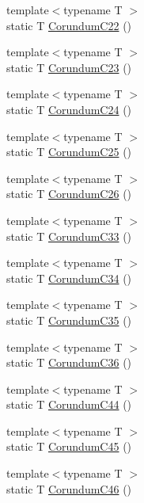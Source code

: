 \begin{DoxyCompactItemize}
{\footnotesize template$<$typename T $>$ }\\static T \mbox{\hyperlink{namespacempc_1_1data_a66e512e49dfa1aa7f95c2073491352bf}{Corundum\+C22}} ()
\item 
{\footnotesize template$<$typename T $>$ }\\static T \mbox{\hyperlink{namespacempc_1_1data_a04ee3c933c108c08e9d6dfd36d41538d}{Corundum\+C23}} ()
\item 
{\footnotesize template$<$typename T $>$ }\\static T \mbox{\hyperlink{namespacempc_1_1data_a6a0486ab291bd5177742e50782fa437d}{Corundum\+C24}} ()
\item 
{\footnotesize template$<$typename T $>$ }\\static T \mbox{\hyperlink{namespacempc_1_1data_a796a0549516d3ca6097b2df0fd089e51}{Corundum\+C25}} ()
\item 
{\footnotesize template$<$typename T $>$ }\\static T \mbox{\hyperlink{namespacempc_1_1data_a0c66b9336c273fac1f61de8066296585}{Corundum\+C26}} ()
\item 
{\footnotesize template$<$typename T $>$ }\\static T \mbox{\hyperlink{namespacempc_1_1data_a0998118d5bfefe62f2562754a455bc6f}{Corundum\+C33}} ()
\item 
{\footnotesize template$<$typename T $>$ }\\static T \mbox{\hyperlink{namespacempc_1_1data_a0c5d889d0235384d47297eed4aefdea1}{Corundum\+C34}} ()
\item 
{\footnotesize template$<$typename T $>$ }\\static T \mbox{\hyperlink{namespacempc_1_1data_a65507f6191b27515bbcb02f456254042}{Corundum\+C35}} ()
\item 
{\footnotesize template$<$typename T $>$ }\\static T \mbox{\hyperlink{namespacempc_1_1data_aa692b36507972d312ded3a06dfd51d58}{Corundum\+C36}} ()
\item 
{\footnotesize template$<$typename T $>$ }\\static T \mbox{\hyperlink{namespacempc_1_1data_aabdcb48654339bafdde09939d6ace19d}{Corundum\+C44}} ()
\item 
{\footnotesize template$<$typename T $>$ }\\static T \mbox{\hyperlink{namespacempc_1_1data_af222e2065c81110150101038ea5e64fa}{Corundum\+C45}} ()
\item 
{\footnotesize template$<$typename T $>$ }\\static T \mbox{\hyperlink{namespacempc_1_1data_ab260906575e5653e282a97bcf4b93c3f}{Corundum\+C46}} ()

\end{DoxyCompactItemize}
